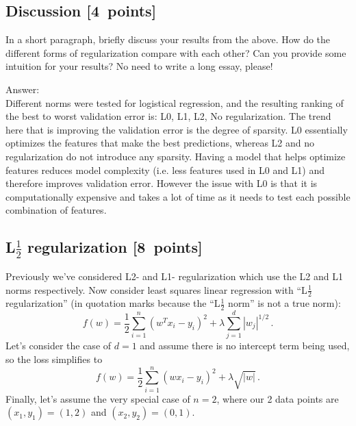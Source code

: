 \documentclass{article}
\newcommand{\gre}[1]{\textcolor{gre}{#1}}
\newcommand\ans[1]{\par\gre{Answer: #1}}
\newcommand\pts[1]{\textcolor{pointscolour}{[#1~points]}}
\begin{document}
\subsection{Discussion \pts{4}}

In a short paragraph, briefly discuss your results from the above. How do the
different forms of regularization compare with each other?
Can you provide some intuition for your results? No need to write a long essay, please!
\ans{\\
Different norms were tested for logistical regression, and the resulting ranking of the best to worst validation error is: L0, L1, L2, No regularization. The trend here that is improving the validation error is the degree of sparsity. L0 essentially optimizes the features that make the best predictions, whereas L2 and no regularization do not introduce any sparsity. Having a model that helps optimize features reduces model complexity (i.e. less features used in L0 and L1) and therefore improves validation error. However the issue with L0 is that it is computationally expensive and takes a lot of time as it needs to test each possible combination of features.\\
}
\newpage
\subsection{L$\frac12$ regularization \pts{8}}

Previously we've considered L2- and L1- regularization which use the L2 and L1 norms respectively. Now consider
least squares linear regression with ``L$\frac12$ regularization'' (in quotation marks because the ``L$\frac12$ norm'' is not a true norm):
\[
f(w) = \frac{1}{2} \sum_{i=1}^n (w^Tx_i - y_i)^2 + \lambda \sum_{j=1}^d |w_j|^{1/2} \, .
\]
Let's consider the case of $d=1$ and
assume there is no intercept term being used, so the loss simplifies to
\[
f(w) = \frac{1}{2} \sum_{i=1}^n (wx_i - y_i)^2 + \lambda \sqrt{|w|} \, .
\]
Finally, let's assume the very special case of $n=2$,
where our 2 data points are $(x_1,y_1)=(1,2)$ and $(x_2,y_2)=(0,1)$.
\end{document}
